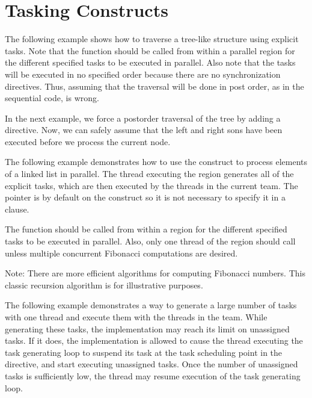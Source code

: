 \pagebreak
\chapter{Tasking Constructs}
\label{chap:tasking}

The following example shows how to traverse a tree-like structure using explicit 
tasks. Note that the  function should be called from within a 
parallel region for the different specified tasks to be executed in parallel. Also 
note that the tasks will be executed in no specified order because there are no 
synchronization directives. Thus, assuming that the traversal will be done in post 
order, as in the sequential code, is wrong.



In the next example, we force a postorder traversal of the tree by adding a  
directive. Now, we can safely assume that the left and right sons have been executed 
before we process the current node.



The following example demonstrates how to use the  construct to process 
elements of a linked list in parallel. The thread executing the  
region generates all of the explicit tasks, which are then executed by the threads 
in the current team. The pointer  is  by default 
on the  construct so it is not necessary to specify it in a  
clause.



The  function should be called from within a   region 
for the different specified tasks to be executed in parallel. Also, only one thread 
of the  region should call  unless multiple concurrent 
Fibonacci computations are desired. 



Note: There are more efficient algorithms for computing Fibonacci numbers. This 
classic recursion algorithm is for illustrative purposes.

The following example demonstrates a way to generate a large number of tasks with 
one thread and execute them with the threads in the team. While generating these 
tasks, the implementation may reach its limit on unassigned tasks.  If it does, 
the implementation is allowed to cause the thread executing the task generating 
loop to suspend its task at the task scheduling point in the  directive, 
and start executing unassigned tasks.  Once the number of unassigned tasks is sufficiently 
low, the thread may resume execution of the task generating loop.

